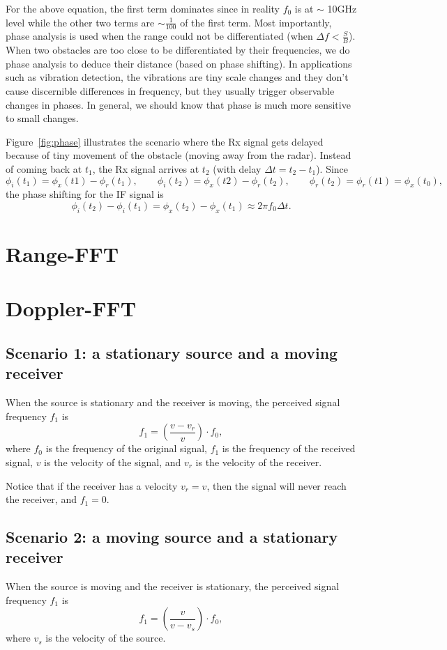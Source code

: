 \documentclass[11pt, oneside]{article}   	%
\begin{document}
For the above equation, the first term dominates since in reality $f_0$ is at $\sim$ 10GHz level while the other two terms are $\sim \frac{1}{100}$ of the first term. Most importantly, phase analysis is used when the range could not be differentiated (when $\Delta f < \frac{S}{B}$). When two obstacles are too close to be differentiated by their frequencies, we do phase analysis to deduce their distance (based on  phase shifting). In applications such as vibration detection, the vibrations are tiny scale changes and they don't cause discernible differences in frequency, but they usually trigger observable changes in phases. In general, we should know that phase is much more sensitive to small changes.

Figure~\ref{fig:phase} illustrates the scenario where the Rx signal gets delayed because of tiny movement of the obstacle (moving away from the radar). Instead of coming back at $t_1$, the Rx signal arrives at $t_2$ (with delay $\Delta t = t_2 - t_1$).  Since
$$\phi_i(t_1) = \phi_x(t1) - \phi_r(t_1), \qquad \phi_i(t_2) = \phi_x(t2) - \phi_r(t_2), \qquad \phi_r(t_2) = \phi_r(t1) = \phi_x(t_0),$$
the phase shifting for the IF signal is
$$\phi_i(t_2)-\phi_i(t_1) = \phi_x(t_2) - \phi_x(t_1) \approx 2\pi f_0 \Delta t.$$

\section{Range-FFT}
\section{Doppler-FFT}
\subsection{Scenario 1: a stationary source and a moving receiver}
When the source is stationary and the receiver is moving, the perceived signal frequency $f_1$ is 
$$f_1 = \left(\frac{v - v_r}{v}\right)\cdot f_0,$$
where $f_0$ is the frequency of the original signal, $f_1$ is the frequency of the received signal, $v$ is the velocity of the signal, and $v_r$ is the velocity of the receiver. 

Notice that if the receiver has a velocity $v_r = v$, then the signal will never reach the receiver, and $f_1 = 0$.



\subsection{Scenario 2: a moving source and a stationary receiver}
When the source is moving and the receiver is stationary, the perceived signal frequency $f_1$ is 
$$f_1 = \left(\frac{v}{v - v_s}\right)\cdot f_0,$$
where  $v_s$ is the velocity of the source. 
\end{document}
